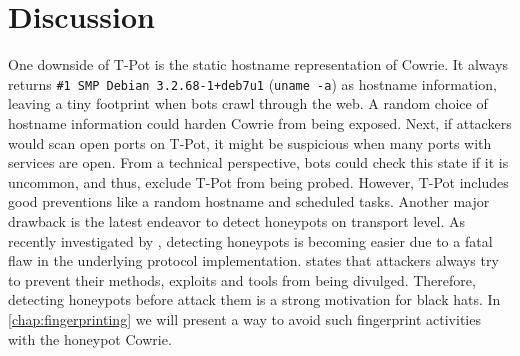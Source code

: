 \section{Discussion}

One downside of T-Pot is the static hostname representation of Cowrie.
It always returns \verb|#1 SMP Debian 3.2.68-1+deb7u1| (\verb|uname -a|) as hostname information, leaving a tiny footprint when bots crawl through the web.
A random choice of hostname information could harden Cowrie from being exposed.
Next, if attackers would scan open ports on T-Pot, it might be suspicious when many ports with services are open.
From a technical perspective, bots could check this state if it is uncommon, and thus, exclude T-Pot from being probed.
However, T-Pot includes good preventions like a random hostname and scheduled tasks.
Another major drawback is the latest endeavor to detect honeypots on transport level.
As recently investigated by \citet{vetterl2020}, detecting honeypots is becoming easier due to a fatal flaw in the underlying protocol implementation.
\citet{vetterl2020} states that attackers always try to prevent their methods, exploits and tools from being divulged.
Therefore, detecting honeypots before attack them is a strong motivation for black hats.
In \autoref{chap:fingerprinting} we will present a way to avoid such fingerprint activities with the honeypot Cowrie.
